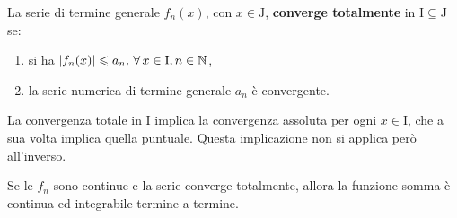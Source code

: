 \documentclass[../../analisi2]{subfiles}
\begin{document}
        \begin{definizione}
            La serie di termine generale \(f_n(x)\), con \(x \in \mathrm{J}\), \textbf{converge totalmente} in
            \(\mathrm{I} \subseteq \mathrm{J}\) se:
            \begin{enumerate}
                \item si ha \(\left|f_n(x)\right| \leqslant a_n, \, \forall \, x \in \mathrm{I}, n \in \mathbb{N}\),
                \item la serie numerica di termine generale \(a_n\) è convergente.
            \end{enumerate}
        \end{definizione}
        \begin{osservazione}
            La convergenza totale in \(\mathrm{I}\) implica la convergenza assoluta per ogni \(\overline{x} \in \mathrm{I}\), che a
            sua volta implica quella puntuale. Questa implicazione non si applica però all'inverso.
        \end{osservazione}
        \begin{osservazione}
            Se le \(f_n\) sono continue e la serie converge totalmente, allora la funzione somma è continua ed integrabile termine
            a termine.
        \end{osservazione}
\end{document}
